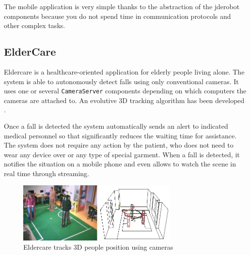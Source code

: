 \documentclass[twocolumn]{svjour3}          %
\begin{document}
The mobile application is very simple thanks to the abstraction of the
jderobot components because you do not spend time in communication
protocols and other complex tasks. 





\subsection{ElderCare}

Eldercare is a healthcare-oriented application for elderly people living alone. The system is able to autonomously detect falls using only conventional cameras. It uses one or several \texttt{CameraServer} components depending on which computers the cameras are attached to. An evolutive 3D tracking algorithm has been developed \cite{canas2011}.

Once a fall is detected the system automatically sends an alert to indicated medical personnel so that significantly reduces the waiting time for assistance. The system does not require any action by the patient, who does not need to wear any device over or any type of special garment. 
When a fall is detected, it notifies the situation on a mobile phone and even allows to watch the scene in real time through streaming.

\begin{figure}
\begin{center}
\includegraphics[width=8cm]{eldercare.png}
\caption{Eldercare tracks 3D people position using cameras}
\end{center}
\label{fig:eldercare}
\end{figure}
\end{document}
